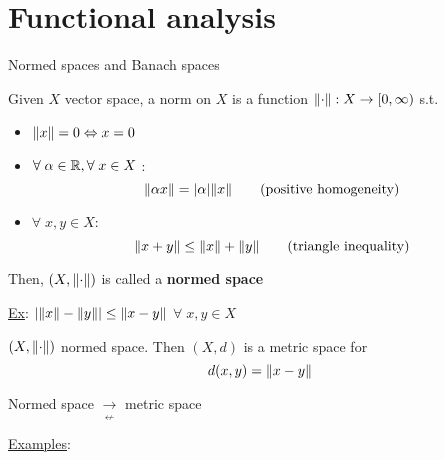 \section*{Functional analysis}
Normed spaces and Banach spaces
\begin{definition}
    Given \(X\) vector space, a norm on \(X\) is a function \(\norm{\cdot} : X \to [0, \infty)\) s.t.
    \begin{itemize}
        \item \(\norm{x} = 0 \Leftrightarrow x = 0\)
        \item \(\forall \; \alpha \in \mathbb{R}, \forall \; x \in X\) : 
        \[
            \norm{\alpha x} = \abs{\alpha}\norm{x}  \tag*{(positive homogeneity)}
        \]
        \item \(\forall \; x,y \in X\): 
        \[
            \norm{x+y} \leq \norm{x} + \norm{y} \tag*{(triangle inequality)}
        \]
    \end{itemize}
    Then, \((X, \norm{\cdot})\) is called a \textbf{normed space}
\end{definition}
\noindent\underline{Ex}: \(\abs{\norm{x} - \norm{y}} \leq \norm{x - y}\) \(\forall \; x,y \in X\)
\begin{proposition}
    \((X, \norm{\cdot})\) normed space. Then \((X, d)\) is a metric space for 
    \[
        d(x,y) = \norm{x - y}
    \]
\end{proposition}
\begin{remark}
    Normed space \(\underset{\displaystyle\nleftarrow}{\rightarrow}\) metric space
\end{remark}
\noindent\underline{Examples}:

